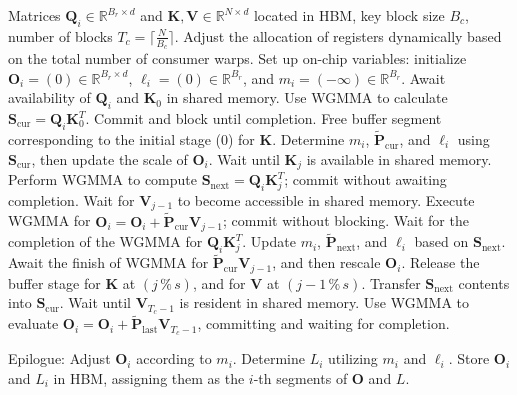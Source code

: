 \begin{algorithm}[H]
    \caption{\small\label{alg:flash3_wgmma}\textsc{FlashAttention-3} consumer warpgroup forward pass}
    \begin{algorithmic}[1]
      \REQUIRE  Matrices $\mathbf{Q}_i \in \mathbb{R}^{B_r \times d}$ and $\mathbf{K}, \mathbf{V} \in \mathbb{R}^{N \times d}$ located in HBM, key block size $B_c$, number of blocks $T_c = \lceil \frac{N}{B_c} \rceil$.
      \STATE Adjust the allocation of registers dynamically based on the total number of consumer warps.
      \STATE Set up on-chip variables: initialize $\mathbf{O}_i = (0) \in \mathbb{R}^{B_r \times d}$, $\ell_i = (0) \in \mathbb{R}^{B_r}$, and $m_i = (-\infty) \in \mathbb{R}^{B_r}$.
      \STATE Await availability of $\mathbf{Q}_i$ and $\mathbf{K}_0$ in shared memory.
      \STATE Use WGMMA to calculate $\mathbf{S}_{\mathrm{cur}} = \mathbf{Q}_i \mathbf{K}_0^T$. Commit and block until completion.
      \STATE Free buffer segment corresponding to the initial stage ($0$) for $\mathbf{K}$.
      \STATE Determine $m_i$, $\tilde{\mathbf{P}}_{\mathrm{cur}}$, and $\ell_i$ using $\mathbf{S}_{\mathrm{cur}}$, then update the scale of $\mathbf{O}_i$.
        \STATE Wait until $\mathbf{K}_j$ is available in shared memory.
        \label{code:mainloop_start}
        \STATE Perform WGMMA to compute $\mathbf{S}_{\mathrm{next}} = \mathbf{Q}_i \mathbf{K}_j^T$; commit without awaiting completion. \label{code:first_wgmma}
        \STATE Wait for $\mathbf{V}_{j-1}$ to become accessible in shared memory.
        \STATE Execute WGMMA for $\mathbf{O}_i = \mathbf{O}_i + \tilde{\mathbf{P}}_{\mathrm{cur}} \mathbf{V}_{j-1}$; commit without blocking. \label{code:second_wgmma}
        \STATE Wait for the completion of the WGMMA for $\mathbf{Q}_i \mathbf{K}_j^T$.
        \STATE Update $m_i$, $\tilde{\mathbf{P}}_{\mathrm{next}}$, and $\ell_i$ based on $\mathbf{S}_{\mathrm{next}}$. \label{code:softmax}
        \STATE Await the finish of WGMMA for $\tilde{\mathbf{P}}_{\mathrm{cur}} \mathbf{V}_{j-1}$, and then rescale $\mathbf{O}_i$.
        \STATE Release the buffer stage for $\mathbf{K}$ at $(j\,\%\,s)$, and for $\mathbf{V}$ at $(j-1\,\%\,s)$.
        \STATE Transfer $\mathbf{S}_{\mathrm{next}}$ contents into $\mathbf{S}_{\mathrm{cur}}$.
        \label{code:mainloop_end}
      \ENDFOR \STATE Wait until $\mathbf{V}_{T_c - 1}$ is resident in shared memory.
      \STATE Use WGMMA to evaluate $\mathbf{O}_i = \mathbf{O}_i + \tilde{\mathbf{P}}_{\mathrm{last}} \mathbf{V}_{T_c - 1}$, committing and waiting for completion.

\STATE Epilogue: Adjust $\mathbf{O}_{i}$ according to $m_{i}$. Determine $L_{i}$ utilizing $m_{i}$ and $\ell_{i}$. 
Store $\mathbf{O}_{i}$ and $L_{i}$ in HBM, assigning them as the $i$-th segments of $\mathbf{O}$ and $L$. 
\end{algorithmic}
\end{algorithm}

